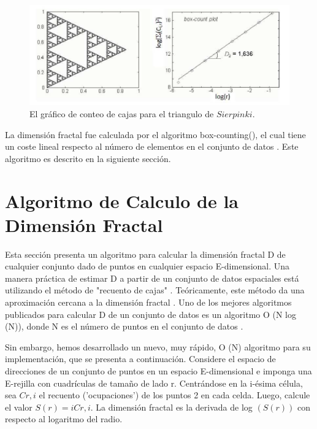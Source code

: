 \begin{figure}[h]
\centering
\includegraphics[scale=1.4]{chapter4/ima4.png}
\caption{El gráfico de conteo de cajas para el triangulo de $Sierpinki$.}
\label{fig:ima4}
\end{figure}

La dimensión fractal fue calculada por el algoritmo box-counting(), el cual tiene un coste lineal respecto al número de elementos en el conjunto de datos  \cite{DBLP:journals/jidm/TrainaTF10}. Este algoritmo es descrito en la siguiente sección. 

\section{Algoritmo de Calculo de la Dimensión Fractal}
 
Esta sección presenta un algoritmo para calcular la dimensión fractal D de cualquier conjunto dado de puntos en cualquier espacio E-dimensional. Una manera práctica de estimar D a partir de un conjunto de datos espaciales está utilizando el método de "recuento de cajas"  \cite{schroederpower}. Teóricamente, este método da una aproximación cercana a la dimensión fractal  \cite{DBLP:journals/jidm/TrainaTF10} \cite{traina1999distance}. Uno de los mejores algoritmos publicados para calcular D de un conjunto de datos es un algoritmo O (N log (N)), donde N es el número de puntos en el conjunto de datos \cite{belussi1998estimating}.  


Sin embargo, hemos desarrollado un nuevo, muy rápido, O (N) algoritmo para su implementación, que se presenta a continuación. Considere el espacio de direcciones de un conjunto de puntos en un espacio E-dimensional e imponga una E-rejilla con cuadrículas de tamaño de lado r. Centrándose en la i-ésima célula, sea $C r, i$ el recuento ('ocupaciones') de los puntos 2 en cada celda. Luego, calcule el valor $S (r) = i C r, i$. La dimensión fractal es la derivada de log $(S (r))$ con respecto al logaritmo del radio. \\

